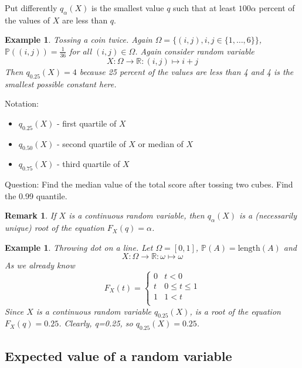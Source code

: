 \documentclass[12pt]{article}
\newtheorem{remark}[theorem]{Remark}
\newtheorem{example}[theorem]{Example}
\begin{document}
Put differently $q_\alpha(X)$ is the smallest value $q$ such that at least $100\alpha$ percent of the values of $X$ are less than $q$. 

\begin{example} Tossing a coin twice. Again $\Omega=\{(i,j), i,j\in\{1,\ldots,6\}\}$, $\mathbb{P}((i,j))=\frac{1}{36}$ for all $(i,j)\in \Omega$. Again consider random variable
$$
X:\Omega\to\mathbb{R}:(i,j)\mapsto i+j 
$$
Then $q_{0.25}(X)=4$ because 25 percent of the values are less than 4 and 4 is the smallest possible constant here.
\end{example}

Notation:
\begin{itemize}
    \item $q_{0.25}(X)$ - first quartile of $X$
    \item $q_{0.50}(X)$ - second quartile of $X$ or median of $X$
    \item $q_{0.75}(X)$ - third quartile of $X$ 
\end{itemize}

Question: Find the median value of the total score after tossing two cubes. Find the 0.99 quantile.

\begin{remark} If $X$ is a continuous random variable, then $q_\alpha(X)$ is a (necessarily unique) root of the equation $F_X(q)=\alpha$. 
\end{remark}

\begin{example} Throwing dot on a line. Let $\Omega=[0,1]$, $\mathbb{P}(A)=\mbox{length}(A)$ and 
$$
X:\Omega\to\mathbb{R}:\omega\mapsto \omega
$$
As we already know
$$
F_X(t)
=\begin{cases}
0 & t < 0\\
t & 0\leq t \leq 1\\
1 & 1 < t\\
\end{cases}
$$
Since $X$ is a continuous random variable $q_{0.25}(X)$, is a root of the equation $F_X(q)=0.25$. Clearly, q=0.25, so
$q_{0.25}(X)=0.25$.
\end{example}


\subsection{Expected value of a random variable}
\end{document}
